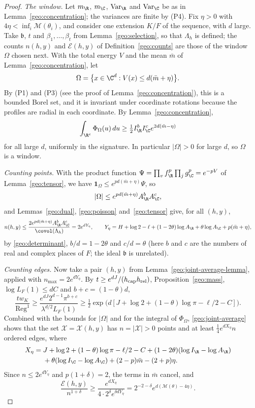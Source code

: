 \begin{proof}
\emph{The window.} Let $m_\R$, $m_\C$, $\mathrm{Var}_\R$ and
$\mathrm{Var}_\C$ be as in Lemma~\ref{geo:concentration}; the variances
are finite by (P4). Fix $\eta>0$ with
$4\eta<\inf_i\mathcal M(\theta_i)$, and consider one extension $K/F$ of
the sequence, with $d$ large. Take $\mathfrak b$, $t$ and
$\beta_1,\dots,\beta_t$ from Lemma~\ref{geo:selection}, so that
$\Lambda_h$ is defined; the counts $n(h,y)$ and $\mathcal E(h,y)$ of
Definition~\ref{geo:counts} are those
of the window $\Omega$ chosen next. With the total energy $V$ and the mean
$\bar m$ of Lemma~\ref{geo:concentration}, let
\[
 \Omega=\bigl\{x\in\C^d:V(x)\le d(\bar m+\eta)\bigr\}.
\]
By (P1) and (P3) (see the proof of Lemma~\ref{geo:concentration}), this
is a bounded Borel set, and it is invariant under
coordinate rotations because the profiles are radial in each
coordinate. By Lemma~\ref{geo:concentration},
\[
 \int_{\R^c}\Phi_\Omega(u)\,du\ge\tfrac12I_\R^bI_\C^ce^{2d(\bar m-\eta)}
\]
for all large $d$, uniformly in the signature. In particular
$|\Omega|>0$ for large $d$, so $\Omega$ is a window.

\emph{Counting points.} With the product function
$\Psi=\prod_vf_\R^p\prod_jg_\C^p=e^{-pV}$ of Lemma~\ref{geo:tensor}, we
have $\mathbf 1_\Omega\le e^{pd(\bar m+\eta)}\Psi$, so
\[
 |\Omega|\le e^{pd(\bar m+\eta)}A_\R^bA_\C^c,
\]
and Lemmas~\ref{geo:dual}, \ref{geo:poisson} and~\ref{geo:tensor} give,
for all $(h,y)$,
\[
 n(h,y)\le\frac{2e^{pd(\bar m+\eta)}A_\R^bA_\C^c}{\covol(\Lambda_h)}
 =2e^{dY_\eta},\qquad
 Y_\eta=H+\log2-\ell+(1-2\theta)\log A_\R+\theta\log A_\C
 +p(\bar m+\eta),
\]
by \eqref{geo:determinant}, $b/d=1-2\theta$ and $c/d=\theta$ (here $b$ and
$c$ are the numbers of real and complex places of $F$; the ideal $\mathfrak b$
is unrelated).

\emph{Counting edges.} Now take a pair $(h,y)$ from
Lemma~\ref{geo:joint-average-lemma}, applied with
$n_{\max}=2e^{dY_\eta}$. By $t\ge e^{dJ}/(h_{\rm cap}h_{\rm rel})$,
Proposition~\ref{geo:mass}, $\log L_F(1)\le dC$ and $b+c=(1-\theta)d$,
\[
 \frac{tw_K}{\operatorname{Reg}^1}\ge
 \frac{e^{dJ}2^{d-1}\pi^{b+c}}{\lambda^{d/2}L_F(1)}
 \ge\tfrac12\exp\bigl(d[J+\log2+(1-\theta)\log\pi-\ell/2-C]\bigr).
\]
Combined with the bounds for $|\Omega|$ and for the integral of
$\Phi_\Omega$, \eqref{geo:joint-average} shows that the set
$\mathcal X=\mathcal X(h,y)$ has $n=|\mathcal X|>0$ points and at least
$\tfrac14e^{dX_\eta}n$ ordered edges, where
\[
 \begin{aligned}
 X_\eta={}&J+\log2+(1-\theta)\log\pi-\ell/2-C
 +(1-2\theta)(\log I_\R-\log A_\R)\\
 &+\theta(\log I_\C-\log A_\C)+(2-p)\bar m-(2+p)\eta.
 \end{aligned}
\]
Since $n\le2e^{dY_\eta}$ and $p(1+\delta)=2$, the terms in $\bar m$ cancel,
and
\[
 \frac{\mathcal E(h,y)}{n^{1+\delta}}
 \ge\frac{e^{dX_\eta}}{4\cdot2^\delta e^{\delta dY_\eta}}
 =2^{-2-\delta}e^{d(\mathcal M(\theta)-4\eta)}.
\]


\end{proof}
